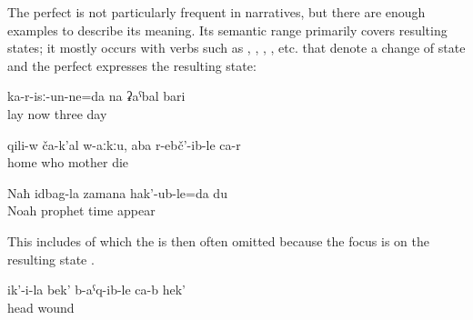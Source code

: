 The perfect is not particularly frequent in narratives, but there are enough examples to describe its meaning. Its semantic range primarily covers resulting states; it mostly occurs with verbs such as , , , , etc. that denote a change of state and the perfect expresses the resulting state:
%
\begin{exe}
	\ex	\label{ex:I have been lying (in the hospital) for three days analytic}
	\gll	ka-r-isː-un-ne=da	na	ʡaˁbal	bari\\
		lay	now	three	day\\
	\glt	{}

	\ex	\label{ex:There is nobody at home, my mother has died analytic}
	\gll	qili-w	ča-k'al	w-aːkːu,	aba	r-ebč'-ib-le	ca-r\\
		home	who		mother	die	\\
	\glt	{}

	\ex	\label{ex:I was born at the time of the prophet Noah}
	\gll	Naħ	idbag-la	zamana	hak'-ub-le=da	du\\
		Noah	prophet	time	appear	\\
	\glt	{}
\end{exe}

This includes  of which the  is then often omitted because the focus is on the resulting state .
%
\begin{exe}
	\ex	\label{ex:Her head has been wounded}
	\gll	ik'-i-la	bek'	b-aˁq-ib-le	ca-b	hek'\\
			head	wound		\\
	\glt	{}
\end{exe}

